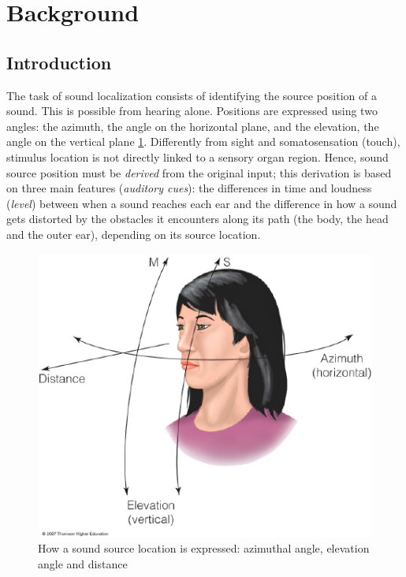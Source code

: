 \documentclass[11pt,a4paper]{article}
\begin{document}
    


\newpage
\tableofcontents
\newpage
\section{Background}
\label{sec:bg}

\subsection{Introduction}
The task of sound localization consists of identifying the source position of a sound. This is possible from hearing alone. Positions are expressed using two angles: the azimuth, the angle on the horizontal plane, and the elevation, the angle on the vertical plane \ref{fig:intro-azim}. Differently from sight and somatosensation (touch), stimulus location is not directly linked to a sensory organ region. Hence, sound source position must be \textit{derived} from the original input; this derivation is based on three main features (\textit{auditory cues}): the differences in time and loudness (\textit{level}) between when a sound reaches each ear and the difference in how a sound gets distorted by the obstacles it encounters along its path (the body, the head and the outer ear),  depending on its source location.
\begin{figure}[H]
    \centering
    \includegraphics[width=0.5\linewidth]{Images/azim.png}
    \caption{How a sound source location is expressed: azimuthal angle, elevation angle and distance}
    \label{fig:intro-azim}
\end{figure}
\end{document}
